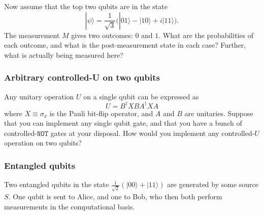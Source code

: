 \documentclass[fleqn]{article}
\begin{document}
Now assume that the top two qubits are in the state
\[
  |\psi\rangle
  = \frac{1}{\sqrt3}\big( |01\rangle - |10\rangle + i|11\rangle \big).
\]
The measurement \(M\) gives two outcomes: \(0\) and \(1\).
What are the probabilities of each outcome, and what is the post-measurement state in each case?
Further, what is actually being measured here?

\hypertarget{arbitrary-controlled-u-on-two-qubits}{%
\subsubsection{Arbitrary controlled-U on two qubits}\label{arbitrary-controlled-u-on-two-qubits}}

Any unitary operation \(U\) on a single qubit can be expressed as
\[
  U = B^\dagger XBA^\dagger XA
\]
where \(X\equiv\sigma_x\) is the Pauli bit-flip operator, and \(A\) and \(B\) are unitaries.
Suppose that you can implement any single qubit gate, and that you have a bunch of controlled-\(\texttt{NOT}\) gates at your disposal.
How would you implement any controlled-\(U\) operation on two qubits?

\hypertarget{entangled-qubits}{%
\subsubsection{Entangled qubits}\label{entangled-qubits}}

Two entangled qubits in the state \(\frac{1}{\sqrt2}(|00\rangle+|11\rangle)\) are generated by some source \(S\).
One qubit is sent to Alice, and one to Bob, who then both perform measurements in the computational basis.
\end{document}
